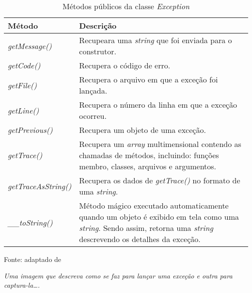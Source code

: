 \begin{table}[h!tb]
	\centering
	\setlength{\belowcaptionskip}{9pt}
	\caption{Métodos públicos da classe \textit{Exception}}
	\begin{tabular}{| l | p{} |}

		\hline
		\textbf{Método}
		& \textbf{Descrição} \\
		\hline

        \textit{getMessage()}
        & Recupeara uma \textit{string} que foi enviada
        para o construtor.

        \\ \cline{1-2}
        \textit{getCode()}
        & Recupera o código de erro.
        \\ \cline{1-2}

        \textit{getFile()}
        & Recupera o arquivo em que a exceção foi lançada.
        \\ \cline{1-2}

        \textit{getLine()}
        & Recupera o número da linha em que a exceção ocorreu.
        \\ \cline{1-2}

        \textit{getPrevious()}
        & Recupera um objeto de uma exceção.
        \\ \cline{1-2}

        \textit{getTrace()}
        & Recupera um \textit{array} multimensional contendo as chamadas de
        métodos, incluindo: funções membro, classes, arquivos e argumentos. \\
        \cline{1-2}

        \textit{getTraceAsString()}
        & Recupera os dados de \textit{getTrace()} no formato de uma
        \textit{string}.
        \\ \cline{1-2}

        \textit{\_\_toString()}
        & Método mágico executado automaticamente quando um objeto é exibido em
        tela como uma \textit{string}. Sendo assim, retorna uma \textit{string}
        descrevendo os detalhes da exceção.
        \\
        \hline
	\end{tabular}
	\newline
	\newline
	\label{tab:excecao}
	\begin{footnotesize}
		Fonte: adaptado de \cite[p.53]{phpObjectsPatternsAndPractice}
	\end{footnotesize}
\end{table}

\FloatBarrier 	%

\textit{Uma imagem que descreva como se faz para lançar uma exceção e outra
para captura-la\ldots.}
